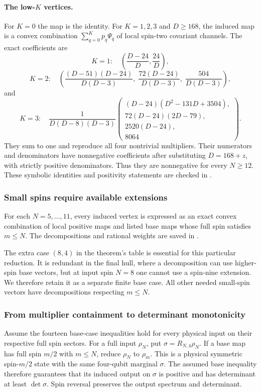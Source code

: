 \documentclass[11pt,a4paper]{article}
\begin{document}
\paragraph{The low-$K$ vertices.}
For $K=0$ the map is the identity. For $K=1,2,3$ and $D\ge168$,
the induced map is a convex combination
$\sum_{q=0}^Kp_q\Psi_q$ of local spin-two covariant channels.
The exact coefficients are
\[
 K=1:\quad
 \left(\frac{D-24}{D},\frac{24}{D}\right),
\]
\[
 K=2:\quad
 \left(
 \frac{(D-51)(D-24)}{D(D-3)},\;
 \frac{72(D-24)}{D(D-3)},\;
 \frac{504}{D(D-3)}
 \right),
\]
and
\[
 K=3:\quad\frac1{D(D-8)(D-3)}
 \left(
 \begin{array}{l}
 (D-24)(D^2-131D+3504),\\
 72(D-24)(2D-79),\\
 2520(D-24),\\
 8064
 \end{array}
 \right).
\]
They sum to one and reproduce all four nontrivial multipliers.
Their numerators and denominators have nonnegative coefficients
after substituting $D=168+z$, with strictly positive denominators.
Thus they are nonnegative for every $N\ge12$. These symbolic
identities and positivity statements are checked in
.

\subsubsection{Small spins require available extensions}
For each $N=5,\ldots,11$, every induced vertex is expressed as an
exact convex combination of local positive maps and listed base
maps whose full spin satisfies $m\le N$.
The decompositions and rational weights are saved in
.

The extra case $(8,4)$ in the theorem's table is essential for this
particular reduction. It is redundant in the final hull, where a
decomposition can use higher-spin base vectors, but at input spin
$N=8$ one cannot use a spin-nine extension. We therefore retain it
as a separate finite base case. All other needed small-spin vectors
have decompositions respecting $m\le N$.

\subsubsection{From multiplier containment to determinant monotonicity}
Assume the fourteen base-case inequalities hold for every physical
input on their respective full spin sectors. For a full input
$\rho_N$, put $\sigma=R_{N,4}\rho_N$.
If a base map has full spin $m/2$ with $m\le N$, reduce $\rho_N$
to $\rho_m$. This is a physical symmetric spin-$m/2$ state with
the same four-qubit marginal $\sigma$. The assumed base inequality
therefore guarantees that its induced output on $\sigma$ is positive
and has determinant at least $\det\sigma$.
Spin reversal preserves the output spectrum and determinant.
\end{document}

